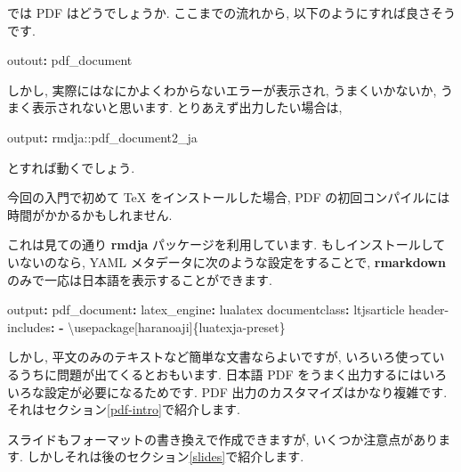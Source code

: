 \documentclass[
]{ltjsarticle}
\newenvironment{Shaded}{\begin{snugshade}}{\end{snugshade}}
\newcommand{\AttributeTok}[1]{\textcolor[rgb]{0.77,0.63,0.00}{#1}}
\newcommand{\FunctionTok}[1]{\textcolor[rgb]{0.00,0.00,0.00}{#1}}
\newcommand{\KeywordTok}[1]{\textcolor[rgb]{0.13,0.29,0.53}{\textbf{#1}}}
\newenvironment{infobox}[1]{\begin{itemize}\renewcommand{\labelitemi}{\raisebox{-.7\height}[0pt][0pt]{%
  {\setkeys{Gin}{width=3em,keepaspectratio}\texttt{[image: \_latex/\_img/\#1]}}}}
  \setlength{\fboxsep}{1em}
  \begin{greyblock}
  \item
  }{\end{greyblock}\end{itemize}
}
\begin{document}
では PDF はどうでしょうか. ここまでの流れから, 以下のようにすれば良さそうです.

\begin{Shaded}
\begin{Highlighting}[]
\FunctionTok{outout}\KeywordTok{:}\AttributeTok{ pdf\_document}
\end{Highlighting}
\end{Shaded}

しかし, 実際にはなにかよくわからないエラーが表示され, うまくいかないか, うまく表示されないと思います. とりあえず出力したい場合は,

\begin{Shaded}
\begin{Highlighting}[]
\FunctionTok{output}\KeywordTok{:}\AttributeTok{ rmdja::pdf\_document2\_ja}
\end{Highlighting}
\end{Shaded}

とすれば動くでしょう.

\begin{infobox}{important}
今回の入門で初めて TeX をインストールした場合, PDF の初回コンパイルには時間がかかるかもしれません.

\end{infobox}

これは見ての通り \textbf{rmdja} パッケージを利用しています. もしインストールしていないのなら, YAML メタデータに次のような設定をすることで, \textbf{rmarkdown} のみで一応は日本語を表示することができます.

\begin{Shaded}
\begin{Highlighting}[]
\FunctionTok{output}\KeywordTok{:}
\AttributeTok{  }\FunctionTok{pdf\_document}\KeywordTok{:}
\AttributeTok{    }\FunctionTok{latex\_engine}\KeywordTok{:}\AttributeTok{ lualatex}
\FunctionTok{documentclass}\KeywordTok{:}\AttributeTok{ ltjsarticle}
\FunctionTok{header{-}includes}\KeywordTok{:}
\AttributeTok{    }\KeywordTok{{-}}\AttributeTok{ \textbackslash{}usepackage[haranoaji]\{luatexja{-}preset\}}
\end{Highlighting}
\end{Shaded}

しかし, 平文のみのテキストなど簡単な文書ならよいですが, いろいろ使っているうちに問題が出てくるとおもいます. 日本語 PDF をうまく出力するにはいろいろな設定が必要になるためです. PDF 出力のカスタマイズはかなり複雑です. それはセクション\ref{pdf-intro}で紹介します.

スライドもフォーマットの書き換えで作成できますが, いくつか注意点があります. しかしそれは後のセクション\ref{slides}で紹介します.
\end{document}
